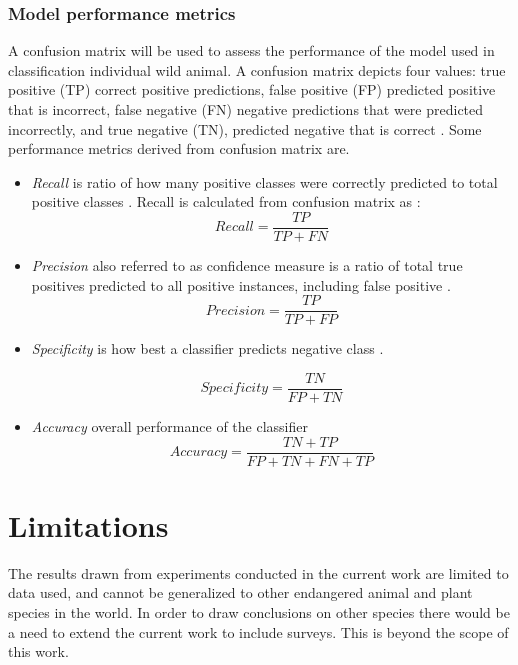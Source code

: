 \subsubsection{Model performance  metrics}
A confusion matrix will be used to assess the performance of the model used in classification individual wild animal. A confusion matrix depicts four values: true positive (TP) correct positive predictions, false positive (FP) predicted positive that is incorrect, false negative (FN) negative predictions that were predicted incorrectly, and true negative (TN), predicted negative that is correct \cite{sokolova2009systematic}. Some performance metrics derived from confusion matrix are. 
\begin{itemize}
    \item \textit{Recall} is  ratio of how many positive classes were correctly predicted to total positive classes \cite{sokolova2009systematic}. Recall is calculated from confusion matrix as : 
    \begin{equation}
         Recall  = \frac{TP}{TP+FN}
    \end{equation}{}
   
    \item \textit{Precision} also referred to as confidence measure is a ratio of total true positives predicted to all positive instances, including false positive \cite{elkan2012evaluating}.    
     \begin{equation}
         Precision  = \frac{TP}{TP+FP}
     \end{equation}{}
     
    \item \textit{Specificity} is how best a classifier predicts negative class \cite{sokolova2009systematic}. 
    
        \begin{equation}
         Specificity  = \frac{TN}{FP+TN}
        \end{equation}{}
    \item \textit{Accuracy} overall performance of the classifier 
    \begin{equation}
         Accuracy  = \frac{TN+TP}{FP+TN+FN+TP}
        \end{equation}{}
    
\end{itemize}{}
\section{Limitations}
The results drawn from experiments conducted in the current work are limited to data used, and cannot be generalized to other endangered animal and plant species in the world. In order to draw conclusions on other species there would be a need to extend the current work to include surveys. This is beyond the scope of this work.   


